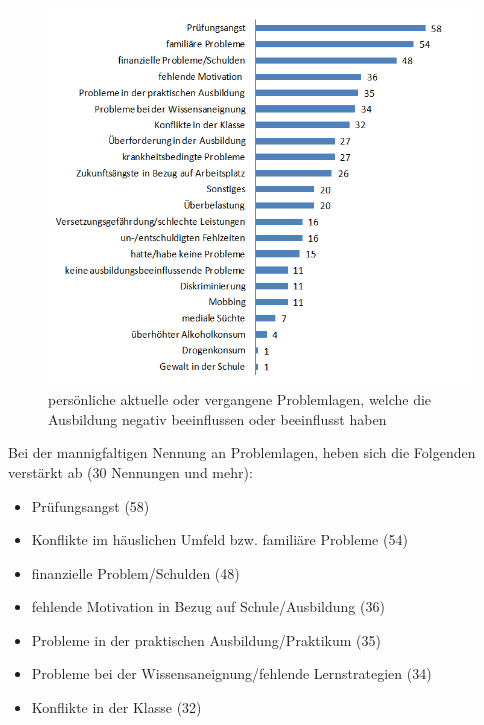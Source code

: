 \begin{figure}[ht]
	\centering
		\includegraphics[width=1.0\textwidth]{images/Aktuelle-oder-vergangene-Probleme-der-Schueler-welche-die-Ausbildung-negativ-beeinflussen-oder-negativ-beeinflusst-haben.png}
	\caption{persönliche aktuelle oder vergangene Problemlagen, welche die Ausbildung negativ beeinflussen oder beeinflusst haben}
	\label{fig:Aktuelle-oder-vergangene-Probleme-der-Schueler-welche-die-Ausbildung-negativ-beeinflussen-oder-negativ-beeinflusst-haben}
\end{figure}

\noindent
Bei der mannigfaltigen Nennung an Problemlagen, heben sich die Folgenden verstärkt ab (30 Nennungen und mehr):

\begin{itemize}
	\item Prüfungsangst (58)
	\item Konflikte im häuslichen Umfeld bzw. familiäre Probleme (54)
	\item finanzielle Problem/Schulden (48)
	\item fehlende Motivation in Bezug auf Schule/Ausbildung (36)
	\item Probleme in der praktischen Ausbildung/Praktikum (35)
	\item Probleme bei der Wissensaneignung/fehlende Lernstrategien (34)
	\item Konflikte in der Klasse (32)
\end{itemize}

